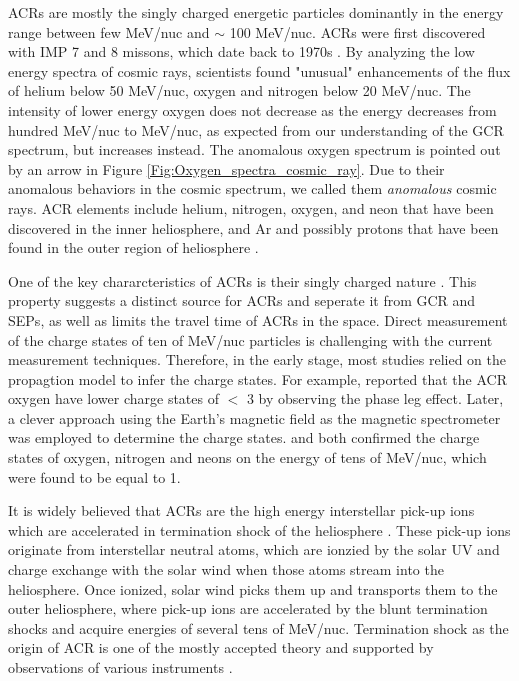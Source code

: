 \acp{ACR} are mostly the singly charged energetic particles dominantly in the energy range between few MeV/nuc and $\sim$ 100 MeV/nuc. \acp{ACR} were first discovered with \ac{IMP} 7 and 8 missons, which date back to 1970s \citep{Garcia1973ICRC, Hoverstadt1973PhRvL, McDonald1974ApJ}. By analyzing the low energy spectra of cosmic rays, scientists found "unusual" enhancements of the flux of helium below 50 MeV/nuc, oxygen and nitrogen below 20 MeV/nuc. The intensity of lower energy oxygen does not decrease as the energy decreases from hundred MeV/nuc to MeV/nuc, as expected from our understanding of the \ac{GCR} spectrum, but increases instead. The anomalous oxygen spectrum is pointed out by an arrow in Figure \ref{Fig:Oxygen_spectra_cosmic_ray}. Due to their anomalous behaviors in the cosmic spectrum, we called them \textit{anomalous} cosmic rays. \ac{ACR} elements include helium, nitrogen, oxygen, and neon that have been discovered in the inner heliosphere, and Ar and possibly protons that have been found in the outer region of heliosphere \citep{Klecker1995SSRv}.

One of the key chararcteristics of \acp{ACR} is their singly charged nature \citep{Klecker1980GeoRL,Adams1991ApJ, Klecker1995ApJ}. This property suggests a distinct source for \acp{ACR} and seperate it from \ac{GCR} and \acp{SEP}, as well as limits the travel time of \acp{ACR} in the space. Direct measurement of the charge states of ten of MeV/nuc particles is challenging with the current measurement techniques. Therefore, in the early stage, most studies relied on the propagtion model to infer the charge states. For example, \citet{Klecker1980GeoRL} reported that the \ac{ACR} oxygen have lower charge states of $<$ 3 by observing the phase leg effect. Later, a clever approach using the Earth's magnetic field as the magnetic spectrometer was employed to determine the charge states. \citet{Adams1991ApJ} and \citet{Klecker1995ApJ} both confirmed the charge states of oxygen, nitrogen and neons on the energy of tens of MeV/nuc, which were found to be equal to 1.

It is widely believed that \acp{ACR} are the high energy interstellar pick-up ions which are accelerated in termination shock of the heliosphere \citep{Fisk1974ApJ}. These pick-up ions originate from interstellar neutral atoms, which are ionzied by the solar \ac{UV} and charge exchange with the solar wind when those atoms stream into the heliosphere. Once ionized, solar wind picks them up and transports them to the outer heliosphere, where pick-up ions are accelerated by the blunt termination shocks \citep{McComas2006GeoRL} and acquire energies of several tens of MeV/nuc. Termination shock as the origin of \ac{ACR} is one of the mostly accepted theory and supported by observations of various instruments \citep{McComas2019ApJ, Cummings2019ICRC}. 

